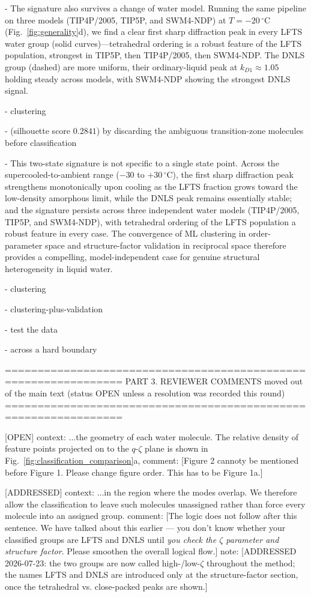 - The signature also survives a change of water model. Running the same pipeline on three models (TIP4P/2005, TIP5P, and SWM4-NDP) at $T=-20\,^\circ$C (Fig.~\ref{fig:generality}d), we find a clear first sharp diffraction peak in every LFTS water group (solid curves)---tetrahedral ordering is a robust feature of the LFTS population, strongest in TIP5P, then TIP4P/2005, then SWM4-NDP. The DNLS group (dashed) are more uniform, their ordinary-liquid peak at $k_{D1} \approx 1.05$ holding steady across models, with SWM4-NDP showing the strongest DNLS signal.

- clustering

- (silhouette score $0.2841$) by discarding the ambiguous transition-zone molecules before classification

- This two-state signature is not specific to a single state point. Across the supercooled-to-ambient range ($-30$ to $+30\,^\circ$C), the first sharp diffraction peak strengthens monotonically upon cooling as the LFTS fraction grows toward the low-density amorphous limit, while the DNLS peak remains essentially stable; and the signature persists across three independent water models (TIP4P/2005, TIP5P, and SWM4-NDP), with tetrahedral ordering of the LFTS population a robust feature in every case. The convergence of ML clustering in order-parameter space and structure-factor validation in reciprocal space therefore provides a compelling, model-independent case for genuine structural heterogeneity in liquid water.

- clustering

- clustering-plus-validation

- test the data

- across a hard boundary

================================================================
 PART 3.  REVIEWER COMMENTS moved out of the main text
   (status OPEN unless a resolution was recorded this round)
================================================================

[OPEN]
   context: ...the geometry of each water molecule. The relative density of feature points projected on to the $q$-$\zeta$ plane is shown in  Fig.~\ref{fig:classification_comparison}a,
   comment: [Figure 2 cannoty be mentioned before Figure 1. Please change figure order. This has to be Figure 1a.]

[ADDRESSED]
   context: ...in the region where the modes overlap. We therefore allow the classification to leave such molecules unassigned rather than force every molecule  into an assigned group.
   comment: [The logic does not follow after this sentence. We have talked about this earlier --- you don't know whether your classified groups are LFTS and DNLS until \emph{you check the $\zeta$ parameter and structure factor}. Please smoothen the overall logical flow.]
   note:    [ADDRESSED 2026-07-23: the two groups are now called high-/low-$\zeta$ throughout the method; the names LFTS and DNLS are introduced only at the structure-factor section, once the tetrahedral vs. close-packed peaks are shown.]

